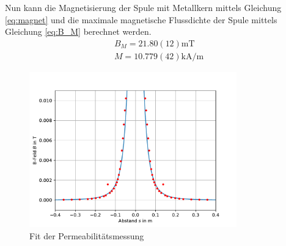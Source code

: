 \documentclass[11pt, a4paper]{article}
\begin{document}
    
    Nun kann die Magnetisierung der Spule mit Metallkern mittels Gleichung \ref{eq:magnet} und die maximale magnetische Flussdichte der Spule mittels Gleichung \ref{eq:B_M} berechnet werden.
   \begin{align}
        B_{M} = 21.80(12) \si{\milli\tesla} \\
        M = 10.779(42) \si{\kilo\ampere\per\metre}
    \end{align}
    \begin{figure}
        \centering
        \includegraphics[width=0.8\textwidth]{mur.pdf}
        \caption{Fit der Permeabilitätsmessung}
        \label{fig:murfit}
    \end{figure}
\end{document}

